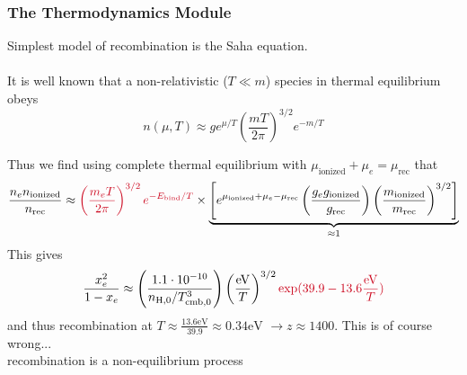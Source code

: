 \begin{frame}[fragile]
	\frametitle{The Thermodynamics Module}
	
	Simplest model of {\Red recombination} is the {\Red Saha equation}.\\ \mbox{}\\ 
	
	It is well known that a non-relativistic ($T \ll m$) species in thermal equilibrium obeys
	\begin{equation}
		n(\mu,T) \approx g e^{\mu/T} \left(\frac{m T}{2 \pi}\right)^{3/2} e^{-m/T}
	\end{equation}
	
	Thus we find using {\Red complete thermal equilibrium} with $\mu_\mathrm{ionized} + \mu_e = \mu_\mathrm{rec}$ that
	\begin{equation*}
		\frac{n_e n_\mathrm{ionized}}{n_\mathrm{rec}} \approx {\Red \left(\frac{m_e T}{2\pi}\right)^{3/2} e^{-E_\mathrm{bind}/T}} \times \underbrace{\left[ e^{\mu_\mathrm{ionized} + \mu_e - \mu_\mathrm{rec}} \left(\frac{g_e g_\mathrm{ionized}}{g_\mathrm{rec}}\right) \left(\frac{m_\mathrm{ionized}}{m_\mathrm{rec}}\right)^{3/2}\right]}_{\approx 1}
	\end{equation*}
	\vspace*{-2\baselineskip}
	This gives
	\begin{equation}
		\frac{x_e^2}{1-x_e} \approx \left(\frac{1.1 \cdot 10^{-10}}{n_\mathrm{H,0} /T_\mathrm{cmb,0}^3}\right) \left(\frac{\mathrm{eV}}{T}\right)^{3/2} {\Red \exp(39.9 - 13.6 \frac{\mathrm{eV}}{T})}
	\end{equation}
	and thus recombination at $T \approx \frac{13.6\mathrm{eV}}{39.9} \approx 0.34\mathrm{eV}$ $\to z \approx 1400$. \pause This is of course wrong...\\ \pause
	{\Red recombination is a non-equilibrium process}
\end{frame}


